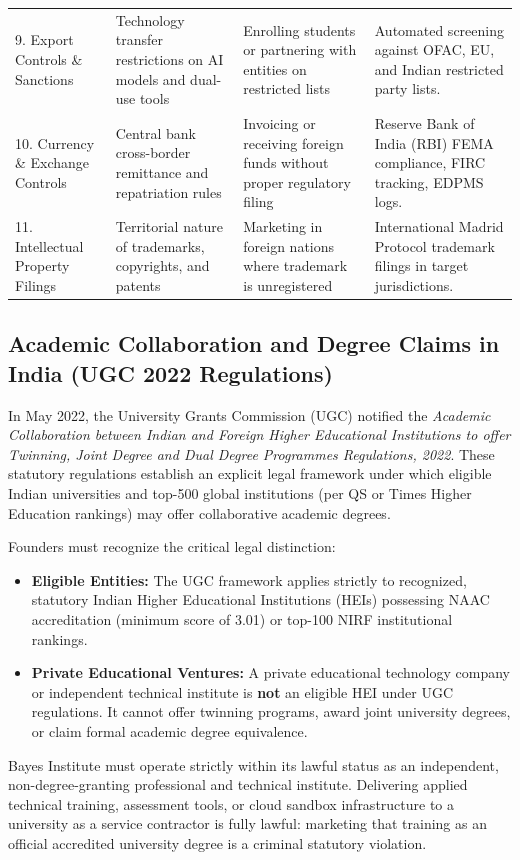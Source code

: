 \begin{table}[t]
\begin{tabularx}{\textwidth}{p{3.2cm} p{3.4cm} p{3.2cm} X}
9. Export Controls \& Sanctions & Technology transfer restrictions on AI models and dual-use tools & Enrolling students or partnering with entities on restricted lists & Automated screening against OFAC, EU, and Indian restricted party lists. \\
10. Currency \& Exchange Controls & Central bank cross-border remittance and repatriation rules & Invoicing or receiving foreign funds without proper regulatory filing & Reserve Bank of India (RBI) FEMA compliance, FIRC tracking, EDPMS logs. \\
11. Intellectual Property Filings & Territorial nature of trademarks, copyrights, and patents & Marketing in foreign nations where trademark is unregistered & International Madrid Protocol trademark filings in target jurisdictions. \\
\bottomrule
\end{tabularx}
\end{table}

\subsection{Academic Collaboration and Degree Claims in India (UGC 2022 Regulations)}
\label{sec:ugc_regulations_academic_collaboration}

In May 2022, the University Grants Commission (UGC) notified the \textit{Academic Collaboration between Indian and Foreign Higher Educational Institutions to offer Twinning, Joint Degree and Dual Degree Programmes Regulations, 2022}. These statutory regulations establish an explicit legal framework under which eligible Indian universities and top-500 global institutions (per QS or Times Higher Education rankings) may offer collaborative academic degrees.

Founders must recognize the critical legal distinction:
\begin{itemize}
\item \textbf{Eligible Entities:} The UGC framework applies strictly to recognized, statutory Indian Higher Educational Institutions (HEIs) possessing NAAC accreditation (minimum score of 3.01) or top-100 NIRF institutional rankings.
\item \textbf{Private Educational Ventures:} A private educational technology company or independent technical institute is \textbf{not} an eligible HEI under UGC regulations. It cannot offer twinning programs, award joint university degrees, or claim formal academic degree equivalence.
\end{itemize}
Bayes Institute must operate strictly within its lawful status as an independent, non-degree-granting professional and technical institute. Delivering applied technical training, assessment tools, or cloud sandbox infrastructure to a university as a service contractor is fully lawful: marketing that training as an official accredited university degree is a criminal statutory violation.


